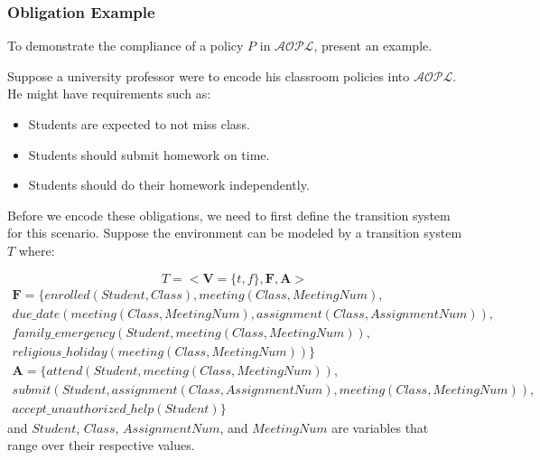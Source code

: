 \subsubsection{Obligation Example}

To demonstrate the compliance of a policy $P$ in $\mathcal{AOPL}$, \citet{gelfond_authorization_2008} present an example.

Suppose a university professor were to encode his classroom policies into $\mathcal{AOPL}$.
He might have requirements such as:

\begin{itemize}
    \item Students are expected to not miss class.
    \item Students should submit homework on time.
    \item Students should do their homework independently.
\end{itemize}

Before we encode these obligations, we need to first define the transition system for this scenario.
Suppose the environment can be modeled by a transition system $T$ where\footnotemark:

\begin{equation}
    T=<\boldsymbol{V}=\{t,f\}, \boldsymbol{F}, \boldsymbol{A}>
\end{equation}
\begin{multline}
    \boldsymbol{F} = \{enrolled(Student, Class), meeting(Class, MeetingNum), \\
        due\_date(meeting(Class, MeetingNum), assignment(Class, AssignmentNum)), \\
        family\_emergency(Student, meeting(Class, MeetingNum)), \\
        religious\_holiday(meeting(Class, MeetingNum))\}
\end{multline}
\begin{multline}
    \boldsymbol{A} = \{attend(Student, meeting(Class, MeetingNum)), \\
        submit(Student, assignment(Class, AssignmentNum), meeting(Class, MeetingNum)), \\
        accept\_unauthorized\_help(Student)\}
\end{multline}
and $Student$, $Class$, $AssignmentNum$, and $MeetingNum$ are variables that range over their respective values.


